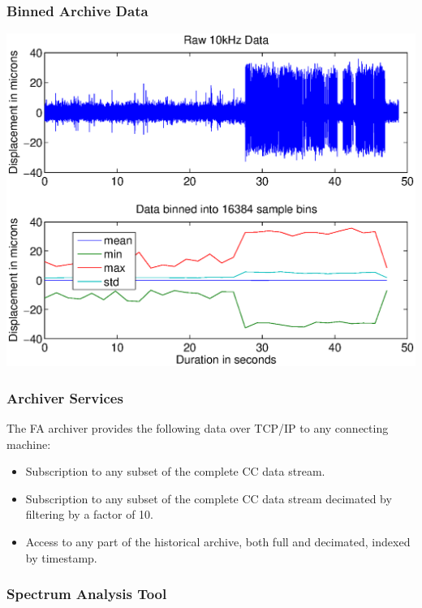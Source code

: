 \documentclass{beamer}
\begin{document}
%
\begin{frame}\frametitle{Binned Archive Data}
\begin{center}
\includegraphics[width=.9\linewidth]{binning}
\end{center}
\end{frame}


%
\begin{frame}\frametitle{Archiver Services}

The FA archiver provides the following data over TCP/IP to any connecting
machine:

\begin{itemize}

\item Subscription to any subset of the complete CC data stream.

\item Subscription to any subset of the complete CC data stream decimated by
filtering by a factor of 10.

\item Access to any part of the historical archive, both full and decimated,
indexed by timestamp.

\end{itemize}
\end{frame}



%
\begin{frame}\frametitle{Spectrum Analysis Tool}
\begin{center}

\end{center}
\end{frame}
\end{document}

